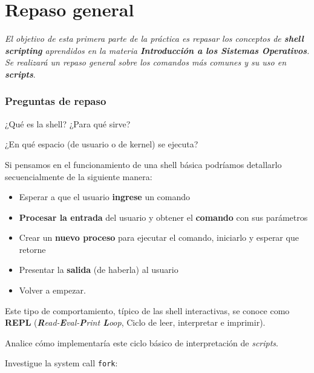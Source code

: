 \section{Repaso general}

\textit{El objetivo de esta primera parte de la práctica es repasar los
  conceptos de \textbf{shell scripting} aprendidos en la materia
  \textbf{Introducción a los Sistemas Operativos}. Se realizará un repaso
  general sobre los comandos más comunes y su uso en
  \textbf{scripts}}.

\subsubsection{Preguntas de repaso}

\begin{questions}

\question ¿Qué es la shell? ¿Para qué sirve?

\question ¿En qué espacio (de usuario o de kernel) se ejecuta?

\question Si pensamos en el funcionamiento de una shell básica podríamos
  detallarlo secuencialmente de la siguiente manera:

  \begin{itemize}
    \item Esperar a que el usuario \textbf{ingrese} un comando
    \item \textbf{Procesar la entrada} del usuario y obtener el \textbf{comando} con sus parámetros
    \item Crear un \textbf{nuevo proceso} para ejecutar el comando, iniciarlo y esperar que retorne
    \item Presentar la \textbf{salida} (de haberla) al usuario
    \item Volver a empezar.
  \end{itemize}

  Este tipo de comportamiento, típico de las shell interactivas, se conoce como \textbf{REPL}
  (\textit{\textbf{R}ead-\textbf{E}val-\textbf{P}rint \textbf{L}oop}, Ciclo de leer, interpretar e imprimir).

  Analice cómo implementaría este ciclo básico de interpretación de \textit{scripts}.

\question Investigue la system call \texttt{fork}:
\end{questions}
